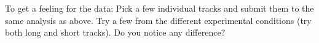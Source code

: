 To get a feeling for the data: Pick a few individual tracks and submit them to the same analysis as above.
Try a few from the different experimental conditions (try both long and short tracks).
Do you notice any difference?